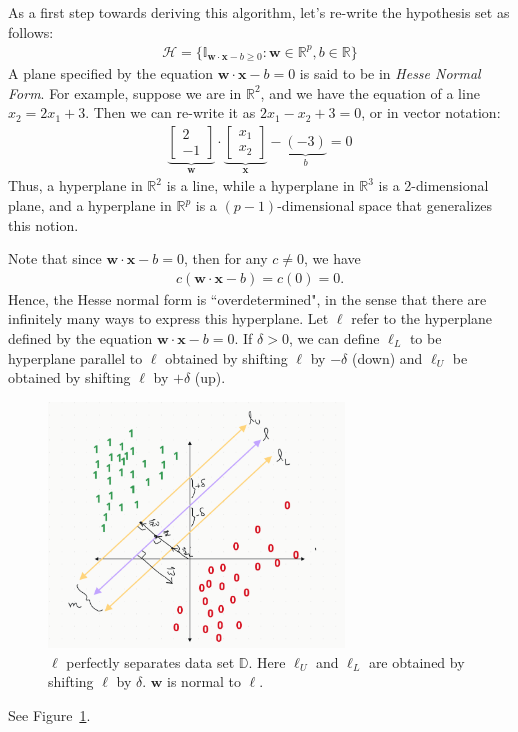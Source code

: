 \documentclass[12pt, a4paper]{article}
\theoremstyle{definition}
\begin{document}
	As a first step towards deriving this algorithm, let's re-write the hypothesis set
	as follows:
	\begin{align*}
		\mathcal{H} = \{\mathbb{I}_{\mathbf{w}\cdot \mathbf{x}-b\geq 0}: \mathbf{w}\in\mathbb{R}^p, b\in\mathbb{R}\}
	\end{align*}
	A plane specified by the equation $\mathbf{w}\cdot \mathbf{x}-b=0$ is said to be in
	\emph{Hesse Normal Form}. For example, suppose we are in $\mathbb{R}^2$, and we have the
	equation of a line $x_2=2x_1+3$. Then we can re-write it as $2x_1-x_2+3=0$, or in vector notation:
	\begin{align*}
		\underbrace{
		\begin{bmatrix}
			2\\
			-1
		\end{bmatrix}
		}_{\mathbf{w}}
		\cdot
		\underbrace{
		\begin{bmatrix}
			x_1\\
			x_2
		\end{bmatrix}
		}_{\mathbf{x}}
		-
		\underbrace{(-3)}_{b}=0
	\end{align*}
	Thus, a hyperplane in $\mathbb{R}^2$ is a line, while a hyperplane in $\mathbb{R}^3$ is
	a 2-dimensional plane, and a hyperplane in $\mathbb{R}^p$ is a $(p- 1)$-dimensional space
	that generalizes this notion.
	
	Note that since $\mathbf{w}\cdot \mathbf{x}-b=0$, then for any $c\neq 0$, we have
	\begin{align*}
		c(\mathbf{w}\cdot \mathbf{x}-b)=c(0)=0.
	\end{align*}
	Hence, the Hesse normal form is ``overdetermined", in the sense that there are infinitely many
	ways to express this hyperplane. Let $\ell$ refer to the hyperplane defined by the equation
	$\mathbf{w}\cdot \mathbf{x}-b=0$. If $\delta>0$, we can define $\ell_L$ to
	be hyperplane parallel to $\ell$ obtained by shifting $\ell$ by $-\delta$ (down)
	and $\ell_U$ be obtained by shifting $\ell$ by $+\delta$ (up).
	\begin{figure}
		\centering
		\includegraphics[width=0.7\textwidth]{svm-derivation-z-vectors}
		\caption{$\ell$ perfectly separates data set $\mathbb{D}$. Here $\ell_U$ and
		$\ell_L$ are obtained by shifting $\ell$ by $\delta$. $\mathbf{w}$ is normal to $\ell$.}
		\label{fig:svm-derivation}
	\end{figure}
	See Figure~\ref{fig:svm-derivation}.
	
\end{document}
